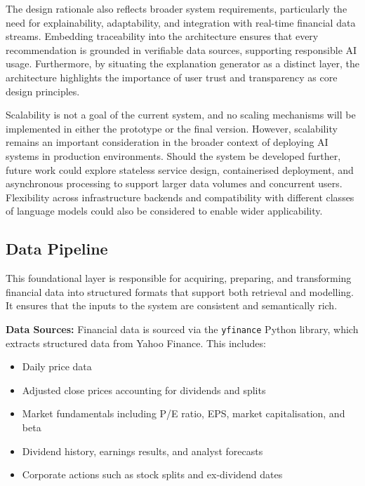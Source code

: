 The design rationale also reflects broader system requirements, particularly the need for explainability, adaptability, and integration with real-time financial data streams. Embedding traceability into the architecture ensures that every recommendation is grounded in verifiable data sources, supporting responsible AI usage. Furthermore, by situating the explanation generator as a distinct layer, the architecture highlights the importance of user trust and transparency as core design principles.

Scalability is not a goal of the current system, and no scaling mechanisms will be implemented in either the prototype or the final version. However, scalability remains an important consideration in the broader context of deploying AI systems in production environments. Should the system be developed further, future work could explore stateless service design, containerised deployment, and asynchronous processing to support larger data volumes and concurrent users. Flexibility across infrastructure backends and compatibility with different classes of language models could also be considered to enable wider applicability.

\subsection{Data Pipeline}

This foundational layer is responsible for acquiring, preparing, and transforming financial data into structured formats that support both retrieval and modelling. It ensures that the inputs to the system are consistent and semantically rich.

\textbf{Data Sources:} Financial data is sourced via the \texttt{yfinance} Python library, which extracts structured data from Yahoo Finance. This includes:
\begin{itemize}
    \item Daily price data
    \item Adjusted close prices accounting for dividends and splits
    \item Market fundamentals including P/E ratio, EPS, market capitalisation, and beta
    \item Dividend history, earnings results, and analyst forecasts
    \item Corporate actions such as stock splits and ex-dividend dates
\end{itemize}

